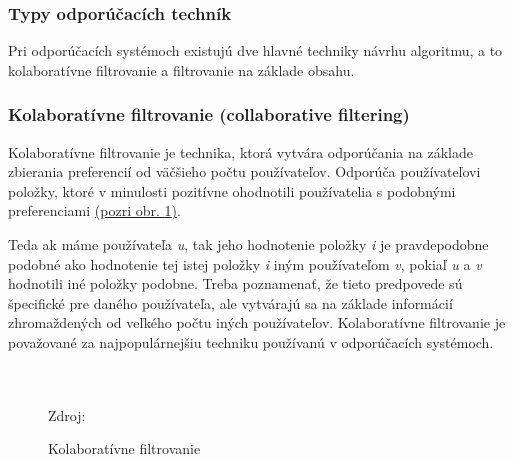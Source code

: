 \subsubsection{Typy odporúčacích techník}
Pri odporúčacích systémoch existujú dve hlavné techniky návrhu algoritmu, a to kolaboratívne filtrovanie a filtrovanie na základe obsahu.\\

\subsubsection{Kolaboratívne filtrovanie (collaborative filtering)}
Kolaboratívne filtrovanie je technika, ktorá vytvára odporúčania na základe zbierania preferencií od väčšieho počtu používateľov. Odporúča používateľovi položky, ktoré v minulosti pozitívne ohodnotili používatelia s podobnými preferenciami \hyperref[collaborativeFiltering]{(pozri obr. \ref{collaborativeFiltering})}. 

Teda ak máme používateľa  \textit{u}, tak jeho hodnotenie položky \textit{i} je pravdepodobne podobné ako hodnotenie tej istej položky \textit{i} iným používateľom \textit{v}, pokiaľ \textit{u} a \textit{v} hodnotili iné položky podobne. Treba poznamenať, že tieto predpovede sú špecifické pre daného používateľa, ale vytvárajú sa na základe informácií zhromaždených od veľkého počtu iných používateľov. Kolaboratívne filtrovanie je považované za najpopulárnejšiu techniku používanú v odporúčacích systémoch. \cite{rs1} \\\\\\


\begin{figure}[!htbp]
  \centering  
  \def\stackalignment{c}
           {\scriptsize%
            Zdroj: \cite{rs3}}
  \caption{Kolaboratívne filtrovanie}
  
  \label{collaborativeFiltering}
\end{figure}

